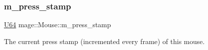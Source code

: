 \subsubsection{\texorpdfstring{m\+\_\+press\+\_\+stamp}{m\_press\_stamp}}
{\footnotesize\ttfamily \hyperlink{namespacemage_a6672cf3c861707ce4a3235a3eb43941d}{U64} mage\+::\+Mouse\+::m\+\_\+press\+\_\+stamp\hspace{0.3cm}{\ttfamily [private]}}

The current press stamp (incremented every frame) of this mouse. 